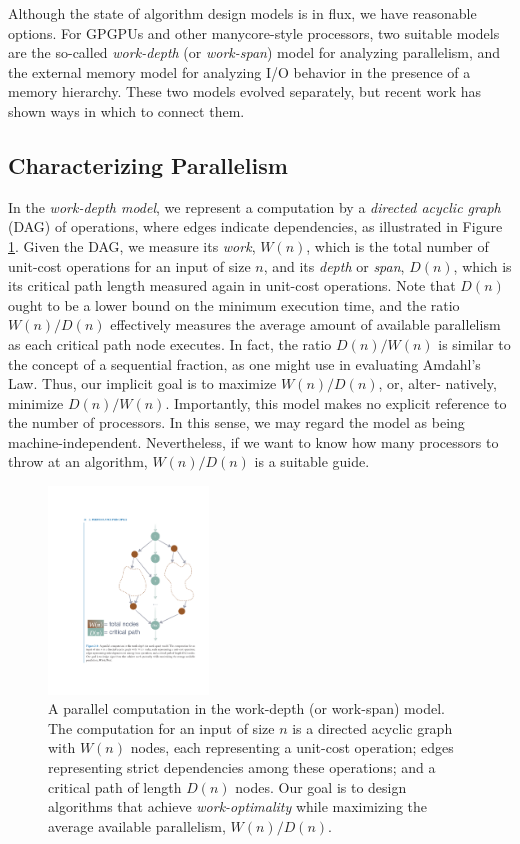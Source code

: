 \documentclass[twocolumn]{article}
\begin{document}
Although the state of algorithm design models is in flux, we have reasonable options. For GPGPUs and other manycore-style processors, two suitable models are the so-called \textit{work-depth} (or \textit{work-span}) model for analyzing parallelism, and the external memory model for analyzing I/O behavior in the presence of a memory hierarchy. These two models evolved separately, but recent work has shown ways in which to connect them. 

\subsection{Characterizing Parallelism}
In the \textit{work-depth model}, we represent a computation by a \textit{directed acyclic graph} (DAG) of operations, where edges indicate dependencies, as illustrated in Figure \ref{fig:worker-depth}. 
Given the DAG, we measure its \textit{work}, $W(n)$, which is the total number of unit-cost operations for an input of size $n$, and its \textit{depth} or \textit{span}, $D(n)$, which is its critical path length measured again in unit-cost operations. 
Note that $D(n)$ ought to be a lower bound on the minimum execution time, and the ratio $W(n)/D(n)$ effectively measures the average amount of available parallelism as each critical path node executes. 
In fact, the ratio $D(n)/W(n)$ is similar to the concept of a sequential fraction, as one might use in evaluating Amdahl’s Law. 
Thus, our implicit goal is to maximize $W (n)/D(n)$, or, alter- natively, minimize $D(n)/W(n)$. 
Importantly, this model makes no explicit reference to the number of processors. 
In this sense, we may regard the model as being machine-independent. 
Nevertheless, if we want to know how many processors to throw at an algorithm, $W (n)/D(n)$ is a suitable guide.
\begin{figure}[htb]
        \centering
        \includegraphics[width=0.38\textwidth]{work-depth-model.pdf}
        \caption{A parallel computation in the work-depth (or work-span) model. The computation for an input of size $n$ is a directed acyclic graph with $W(n)$ nodes, each representing a unit-cost operation; edges representing strict dependencies among these operations; and a critical path of length $D(n)$ nodes. Our goal is to design algorithms that achieve \textit{work-optimality} while maximizing the average available parallelism, $W (n)/D(n)$.}
        \label{fig:worker-depth}
\end{figure}
\end{document}
